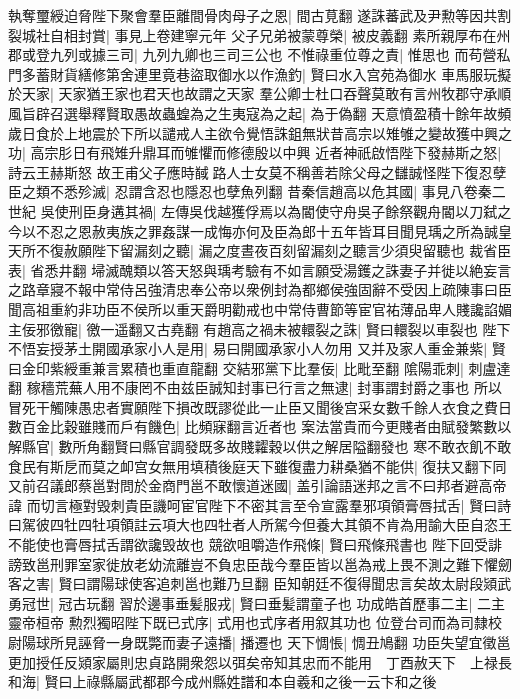 執奪璽綬迫脅陛下聚會羣臣離間骨肉母子之恩|{
	間古莧翻}
遂誅蕃武及尹勲等因共割裂城社自相封賞|{
	事見上卷建寧元年}
父子兄弟被蒙尊榮|{
	被皮義翻}
素所親厚布在州郡或登九列或據三司|{
	九列九卿也三司三公也}
不惟祿重位尊之責|{
	惟思也}
而苟營私門多蓄財貨繕修第舍連里竟巷盜取御水以作漁釣|{
	賢曰水入宫苑為御水}
車馬服玩擬於天家|{
	天家猶王家也君天也故謂之天家}
羣公卿士杜口吞聲莫敢有言州牧郡守承順風旨辟召選舉釋賢取愚故蟲蝗為之生夷寇為之起|{
	為于偽翻}
天意憤盈積十餘年故頻歲日食於上地震於下所以譴戒人主欲令覺悟誅鉏無狀昔高宗以雉雊之變故獲中興之功|{
	高宗肜日有飛雉升鼎耳而雊懼而修德殷以中興}
近者神祇啟悟陛下發赫斯之怒|{
	詩云王赫斯怒}
故王甫父子應時馘路人士女莫不稱善若除父母之讎誠怪陛下復忍孽臣之類不悉殄滅|{
	忍謂含忍也隱忍也孽魚列翻}
昔秦信趙高以危其國|{
	事見八卷秦二世紀}
吳使刑臣身遘其禍|{
	左傳吳伐越獲俘焉以為閽使守舟吳子餘祭觀舟閽以刀弑之}
今以不忍之恩赦夷族之罪姦謀一成悔亦何及臣為郎十五年皆耳目聞見瑀之所為誠皇天所不復赦願陛下留漏刻之聽|{
	漏之度晝夜百刻留漏刻之聽言少須臾留聽也}
裁省臣表|{
	省悉井翻}
埽滅醜類以答天怒與瑀考驗有不如言願受湯鑊之誅妻子并徙以絶妄言之路章寢不報中常侍呂強清忠奉公帝以衆例封為都鄉侯強固辭不受因上疏陳事曰臣聞高祖重約非功臣不侯所以重天爵明勸戒也中常侍曹節等宦官祐薄品卑人賤讒諂媚主佞邪徼寵|{
	徼一遥翻又古堯翻}
有趙高之禍未被轘裂之誅|{
	賢曰轘裂以車裂也}
陛下不悟妄授茅土開國承家小人是用|{
	易曰開國承家小人勿用}
又并及家人重金兼紫|{
	賢曰金印紫綬重兼言累積也重直龍翻}
交結邪黨下比羣佞|{
	比毗至翻}
隂陽乖刺|{
	刺盧達翻}
稼穡荒蕪人用不康罔不由兹臣誠知封事已行言之無逮|{
	封事謂封爵之事也}
所以冒死干觸陳愚忠者實願陛下損改既謬從此一止臣又聞後宫采女數千餘人衣食之費日數百金比穀雖賤而戶有饑色|{
	比頻寐翻言近者也}
案法當貴而今更賤者由賦發繁數以解縣官|{
	數所角翻賢曰縣官調發既多故賤糶穀以供之解居隘翻發也}
寒不敢衣飢不敢食民有斯戹而莫之卹宫女無用填積後庭天下雖復盡力耕桑猶不能供|{
	復扶又翻下同}
又前召議郎蔡邕對問於金商門邕不敢懷道迷國|{
	盖引論語迷邦之言不曰邦者避高帝諱}
而切言極對毁刺貴臣譏呵宦官陛下不密其言至令宣露羣邪項領膏唇拭舌|{
	賢曰詩曰駕彼四牡四牡項領註云項大也四牡者人所駕今但養大其領不肯為用諭大臣自恣王不能使也膏唇拭舌謂欲讒毁故也}
競欲咀嚼造作飛條|{
	賢曰飛條飛書也}
陛下回受誹謗致邕刑罪室家徙放老幼流離豈不負忠臣哉今羣臣皆以邕為戒上畏不測之難下懼劒客之害|{
	賢曰謂陽球使客追刺邕也難乃旦翻}
臣知朝廷不復得聞忠言矣故太尉段熲武勇冠世|{
	冠古玩翻}
習於邊事垂髪服戎|{
	賢曰垂髪謂童子也}
功成皓首歷事二主|{
	二主靈帝桓帝}
勲烈獨昭陛下既已式序|{
	式用也式序者用叙其功也}
位登台司而為司隸校尉陽球所見誣脅一身既斃而妻子遠播|{
	播遷也}
天下惆悵|{
	惆丑鳩翻}
功臣失望宜徵邕更加授任反熲家屬則忠貞路開衆怨以弭矣帝知其忠而不能用　丁酉赦天下　上禄長和海|{
	賢曰上祿縣屬武都郡今成州縣姓譜和本自羲和之後一云卞和之後}
